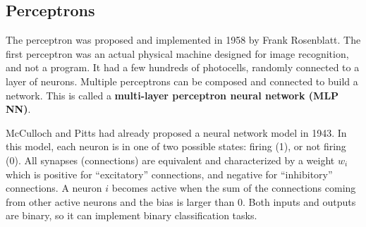 \subsection{Perceptrons}

The perceptron was proposed and implemented in 1958 by Frank Rosenblatt. The first perceptron was an actual physical machine designed for image recognition, and not a program. It had a few hundreds of photocells, randomly connected to a layer of neurons. Multiple perceptrons can be composed and connected to build a network. This is called a \textbf{multi-layer perceptron neural network (MLP NN)}. 

McCulloch and Pitts had already proposed a neural network model in 1943. In this model, each neuron is in one of two possible states: firing (1), or not firing (0). All synapses (connections) are equivalent and characterized by a weight $w_i$ which is positive for ``excitatory'' connections, and negative for ``inhibitory'' connections. A neuron $i$ becomes active when the sum of the connections coming from other active neurons and the bias is larger than 0. Both inputs and outputs are binary, so it can implement binary classification tasks.


